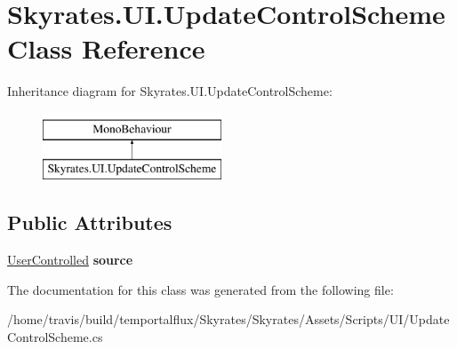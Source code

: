 \hypertarget{class_skyrates_1_1_u_i_1_1_update_control_scheme}{\section{Skyrates.\-U\-I.\-Update\-Control\-Scheme Class Reference}
\label{class_skyrates_1_1_u_i_1_1_update_control_scheme}
}
Inheritance diagram for Skyrates.\-U\-I.\-Update\-Control\-Scheme\-:\begin{figure}[H]
\begin{center}
\leavevmode
\includegraphics[height=2.000000cm]{class_skyrates_1_1_u_i_1_1_update_control_scheme}
\end{center}
\end{figure}
\subsection*{Public Attributes}
\begin{DoxyCompactItemize}
\item 
\hypertarget{class_skyrates_1_1_u_i_1_1_update_control_scheme_ad6d7c6c03029bacb521d9c50a4f083c4}{\hyperlink{class_skyrates_1_1_a_i_1_1_custom_1_1_user_controlled}{User\-Controlled} {\bfseries source}}\label{class_skyrates_1_1_u_i_1_1_update_control_scheme_ad6d7c6c03029bacb521d9c50a4f083c4}

\end{DoxyCompactItemize}


The documentation for this class was generated from the following file\-:\begin{DoxyCompactItemize}
\item 
/home/travis/build/temportalflux/\-Skyrates/\-Skyrates/\-Assets/\-Scripts/\-U\-I/Update\-Control\-Scheme.\-cs\end{DoxyCompactItemize}
